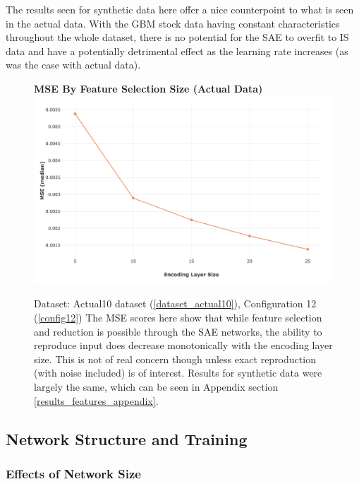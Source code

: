 \documentclass[a4paper,11pt,oneside]{article}
\theoremstyle{plain}
\theoremstyle{definition}
\begin{document}
The results seen for synthetic data here offer a nice counterpoint to what is seen in the actual data. With the GBM stock data having constant characteristics throughout the whole dataset, there is no potential for the SAE to overfit to IS data and have a potentially detrimental effect as the learning rate increases (as was the case with actual data).


\begin{figure}[H]
	\centering 
	\textbf{MSE By Feature Selection Size (Actual Data)}
	\includegraphics[scale=0.4]{images/results/feature_selection/actual_sae_mse.png}
	\caption[MSE By Feature Selection Size (Actual Data)]{Dataset: Actual10 dataset (\ref{dataset_actual10}), Configuration 12 (\ref{config12})
		\newline The MSE scores here show that while feature selection and reduction is possible through the SAE networks, the ability to reproduce input does decrease monotonically with the encoding layer size. This is not of real concern though unless exact reproduction (with noise included) is of interest. Results for synthetic data were largely the same, which can be seen in Appendix section \ref{results_features_appendix}.}
	\label{figure-actual_sae_mse}
\end{figure}

\newpage

\subsection{Network Structure and Training}\label{results_network}

\subsubsection{Effects of Network Size}
\end{document}
